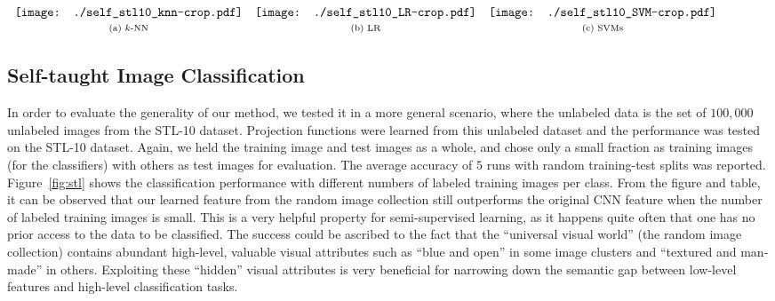 \documentclass[preprint,12pt,3p]{elsarticle}
\begin{document}
\begin{figure*} 
  \centering
   $ \begin{array}{cccc}
\texttt{[image: ./self\_stl10\_knn-crop.pdf]}& 
\texttt{[image: ./self\_stl10\_LR-crop.pdf]}& 
\texttt{[image: ./self\_stl10\_SVM-crop.pdf]} \\
\scriptsize{\text{(a) $k$-NN}}  & \scriptsize{\text{(b) LR}} & \scriptsize{\text{(c) SVMs}}
\end{array}$
\caption{Self-taught classification results on dataset STL-10, where EP is learned from the unlabeled images. The
  classifiers were tested with deep features, and our learned feature from it (indicated by ``+ EP").}
  \label{fig:stl}
\end{figure*}


\subsection{Self-taught Image Classification}
\label{sec:self}
In order to evaluate the generality of our method, we tested it in a
more general scenario, where the unlabeled data is the set of
$100,000$ unlabeled images from the STL-10 dataset. Projection
functions were learned from this unlabeled dataset and the performance
was tested on the STL-10 dataset. Again, we held the training image
and test images as a whole, and chose only a small fraction as
training images (for the classifiers) with others as test images for
evaluation.  The average accuracy of $5$ runs with random
training-test splits was reported.  Figure~\ref{fig:stl} shows the
classification performance with different numbers of labeled training
images per class.  From the figure and table, it can be observed that our
learned feature from the random image collection still outperforms the
original CNN feature when the number of labeled training images is
small.
This is a very helpful property for semi-supervised learning,
as it happens quite often that one has no prior access to the data to
be classified. The success could be ascribed to the fact that the
``universal visual world'' (the random image collection) contains
abundant high-level, valuable visual attributes such as ``blue and
open'' in some image clusters and ``textured and man-made'' in
others. Exploiting these ``hidden'' visual attributes is very
beneficial for narrowing down the semantic gap between low-level
features and high-level classification tasks.
\end{document}
